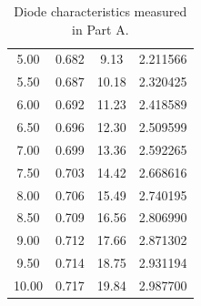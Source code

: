 \documentclass{article}
\begin{document}
\begin{table}[hbtp]
\begin{tabular}{cccc}
    5.00 & 0.682 & 9.13 & 2.211566 \\
    5.50 & 0.687 & 10.18 & 2.320425 \\
    6.00 & 0.692 & 11.23 & 2.418589 \\
    6.50 & 0.696 & 12.30 & 2.509599 \\
    7.00 & 0.699 & 13.36 & 2.592265 \\
    7.50 & 0.703 & 14.42 & 2.668616 \\
    8.00 & 0.706 & 15.49 & 2.740195 \\
    8.50 & 0.709 & 16.56 & 2.806990 \\
    9.00 & 0.712 & 17.66 & 2.871302 \\
    9.50 & 0.714 & 18.75 & 2.931194 \\
    10.00 & 0.717 & 19.84 & 2.987700 \\
  \end{tabular}
  \caption{\label{tab:part_a} Diode characteristics measured in Part A.}
\end{table}
\end{document}
